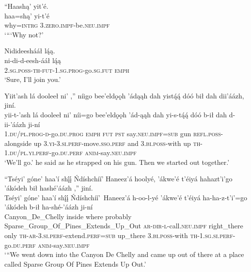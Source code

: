 \ea\label{ex:text2-14-1}
``Haashą’ yit’é.\\
\gll haa=shą’	yi-t’é\\
     why=\textsc{intrg}	3.\textsc{zero}.\textsc{impf}-be.\textsc{neu}.\textsc{impf}\\
\glt `{``}`Why not?'
\z

\ea\label{ex:text2-14-2}
Nidideeshááł lą́ą.\\
\gll ni-di-d-eesh-ááł	lą́ą\\
     2.\textsc{sg}.\textsc{poss}-\textsc{th}-\textsc{fut}-1.\textsc{sg}.\textsc{prog}-go.\textsc{sg}.\textsc{fut}	\textsc{emph}\\
\glt `Sure, I'll join you.'
\z

\ea\label{ex:text2-14-3}
Yiit’ash lá dooleeł ni’ ,'' níigo bee’eldǫǫh ’ádąąh dah yistą́ą́ dóó bił dah dii’áázh, jiní.\\
\gll yii-t-’ash	lá	dooleeł	ni’	níi=go	bee’eldǫǫh	’ád-ąąh	dah	yi-s-tą́ą́	dóó	b-ił	dah	d-ii-’áázh	ji-ní\\
     1.\textsc{du}/\textsc{pl}.\textsc{prog}-\textsc{d}-go.\textsc{du}.\textsc{prog}	\textsc{emph}	\textsc{fut}	\textsc{pst}	say.\textsc{neu}.\textsc{impf}=\textsc{sub}	gun	\textsc{refl}.\textsc{poss}-alongside	up	3.\textsc{yi}-3.\textsc{si}.\textsc{perf}-move.\textsc{sso}.\textsc{perf}	and	3.\textsc{bi}.\textsc{poss}-with	up	\textsc{th}-1.\textsc{du}/\textsc{pl}.\textsc{yi}.\textsc{perf}-go.\textsc{du}.\textsc{perf}	\textsc{anim}-say.\textsc{neu}.\textsc{impf}\\
\glt `We'll go.' he said as he strapped on his gun. Then we started out together.'
\z

\ea\label{ex:text2-15-1}
``Tséyi’ góne’ haa’í shį́į́ Ńdíshchíí’ Haneez’á hoolyé, ’ákwe’é t’éiyá hahazt’i’go ’ákódeh bił hashé’áázh ,'' jiní.\\
\gll Tséyi’	góne’	haa’í	shį́į́	Ńdíshchíí’~{Haneez’á}	h-oo-l-yé	’ákwe’é	t’éiyá	ha-ha-z-t’i’=go	’ákódeh	b-ił	ha-shé-’áázh	ji-ní\\
     Canyon\_De\_Chelly	inside	where	probably	Sparse\_Group\_Of\_Pines\_Extends\_Up\_Out	\textsc{ar}-\textsc{dir}-\textsc{l}-call.\textsc{neu}.\textsc{impf}	right\_there	only	\textsc{th}-\textsc{ar}-3.\textsc{si}.\textsc{perf}-extend.\textsc{perf}=\textsc{sub}	up\_there	3.\textsc{bi}.\textsc{poss}-with	\textsc{th}-1.\textsc{sg}.\textsc{si}.\textsc{perf}-go.\textsc{du}.\textsc{perf}	\textsc{anim}-say.\textsc{neu}.\textsc{impf}\\
\glt `{``}We went down into the Canyon De Chelly and came up out of there at a place called Sparse Group Of Pines Extends Up Out.'
\z

